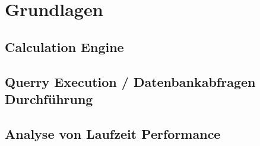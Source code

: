 \chapter{Grundlagen}
\section{Calculation Engine}
\section{Querry Execution / Datenbankabfragen Durchführung}
\section{Analyse von Laufzeit Performance}
